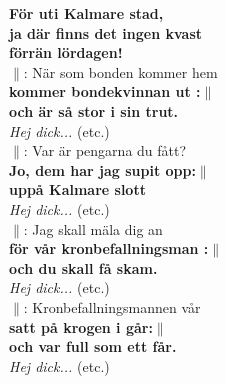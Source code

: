 \documentclass[a6paper, 10pt, twoside]{article}
\begin{document}
\textbf{För uti Kalmare stad,\\ ja där finns det ingen kvast\\ förrän lördagen!}
\vspace{5pt} \\
$\|$: När som bonden kommer hem \\
\textbf{kommer bondekvinnan ut :$\|$ \\och är så stor i sin trut.}
\vspace{5pt} \\
\textit{Hej dick...} (etc.) 
\vspace{5pt} \\
$\|$: Var är pengarna du fått?\\
\textbf{Jo, dem har jag supit opp:$\|$ \\uppå Kalmare slott}
\vspace{5pt} \\
\textit{Hej dick...} (etc.)
\vspace{5pt} \\
$\|$: Jag skall mäla dig an\\
\textbf{för vår kronbefallningsman :$\|$ \\ och du skall få skam.}
\noindent
\vspace{5pt} \\
\textit{Hej dick...} (etc.)
\vspace{5pt} \\
$\|$: Kronbefallningsmannen vår \\
\textbf{satt på krogen i går:$\|$\\ och var full som ett får.}
\vspace{5pt} \\
\textit{Hej dick...} (etc.)
\end{document}
